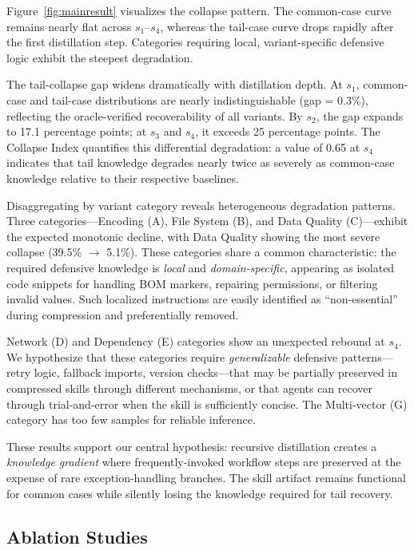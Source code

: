 \documentclass[11pt]{article}
\begin{document}
Figure~\ref{fig:mainresult} visualizes the collapse pattern. The common-case curve remains nearly flat across $s_1$--$s_4$, whereas the tail-case curve drops rapidly after the first distillation step. Categories requiring local, variant-specific defensive logic exhibit the steepest degradation.

The tail-collapse gap widens dramatically with distillation depth. At $s_1$, common-case and tail-case distributions are nearly indistinguishable (gap = 0.3\%), reflecting the oracle-verified recoverability of all variants. By $s_2$, the gap expands to 17.1 percentage points; at $s_3$ and $s_4$, it exceeds 25 percentage points. The Collapse Index quantifies this differential degradation: a value of 0.65 at $s_4$ indicates that tail knowledge degrades nearly twice as severely as common-case knowledge relative to their respective baselines.

Disaggregating by variant category reveals heterogeneous degradation patterns. Three categories---Encoding (A), File System (B), and Data Quality (C)---exhibit the expected monotonic decline, with Data Quality showing the most severe collapse (39.5\% $\to$ 5.1\%). These categories share a common characteristic: the required defensive knowledge is \textit{local} and \textit{domain-specific}, appearing as isolated code snippets for handling BOM markers, repairing permissions, or filtering invalid values. Such localized instructions are easily identified as ``non-essential'' during compression and preferentially removed.

Network (D) and Dependency (E) categories show an unexpected rebound at $s_4$. We hypothesize that these categories require \textit{generalizable} defensive patterns---retry logic, fallback imports, version checks---that may be partially preserved in compressed skills through different mechanisms, or that agents can recover through trial-and-error when the skill is sufficiently concise. The Multi-vector (G) category has too few samples for reliable inference.

These results support our central hypothesis: recursive distillation creates a \textit{knowledge gradient} where frequently-invoked workflow steps are preserved at the expense of rare exception-handling branches. The skill artifact remains functional for common cases while silently losing the knowledge required for tail recovery.


\subsection{Ablation Studies}
\label{sec:ablation}
\end{document}
